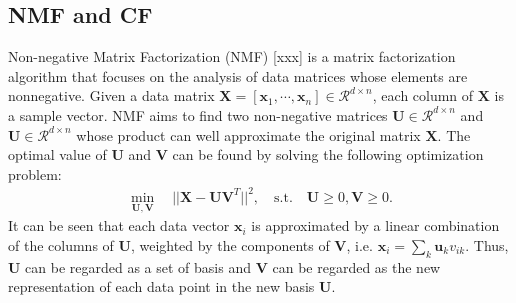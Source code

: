 \documentclass[10pt,journal,compsoc]{IEEEtran}
\newcommand{\st}{\mathrm{s.t.}}
\begin{document}
\subsection{NMF and CF}
Non-negative Matrix Factorization (NMF) [xxx] is a matrix factorization algorithm that focuses on the analysis of data matrices whose elements are nonnegative. Given a data matrix $\mathbf{X} = [\mathbf{x}_1, \cdots , \mathbf{x}_n ] \in \mathcal{R}^{d \times n}$, each column of $\mathbf{X}$ is a sample vector. NMF aims to find two non-negative matrices $\mathbf{U} \in \mathcal{R}^{d \times n}$ and $\mathbf{U} \in \mathcal{R}^{d \times n}$ whose product can well approximate the original matrix $\mathbf{X}$. The optimal value of $\mathbf{U}$ and $\mathbf{V}$ can be found by solving the following optimization problem:
\begin{align}
\min_{\mathbf{U}, \mathbf{V}} \quad ||\mathbf{X} - \mathbf{U} \mathbf{V}^T ||^2, \quad \st \quad \mathbf{U} \geq 0, \mathbf{V} \geq 0.
\end{align}
It can be seen that each data vector $\mathbf{x}_i$ is approximated by a linear combination of the columns of $\mathbf{U}$, weighted by the components of $\mathbf{V}$, i.e. $\mathbf{x}_i = \sum_{k} \mathbf{u}_k v_{ik}$. Thus, $\mathbf{U}$ can be regarded as a set of basis and $\mathbf{V}$ can be regarded as the new representation of each data point in the new basis $\mathbf{U}$.
\end{document}

